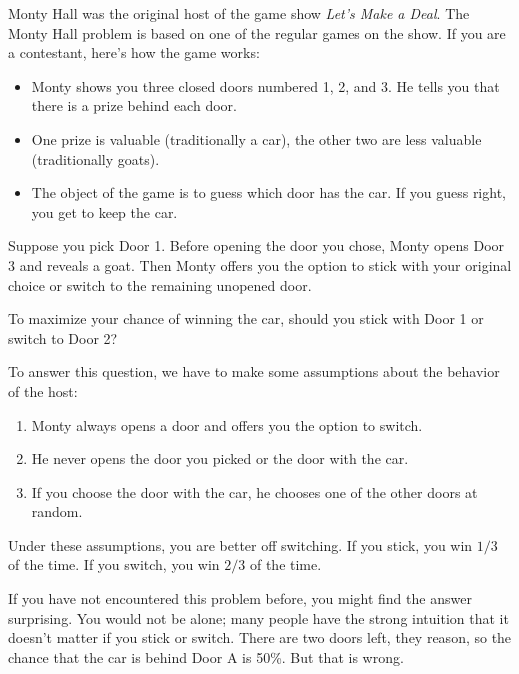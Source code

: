 \documentclass[12pt]{book}
\theoremstyle{exercise}
\begin{document}

Monty Hall was the original host of the game show {\em Let's Make a
Deal}.
The Monty Hall problem is based on one of the regular
games on the show.
If you are a contestant, here's how the game works:

\begin{itemize}

\item Monty shows you three closed doors numbered 1, 2, and 3.
He tells you that there is a prize behind each door.

\item One prize is valuable (traditionally a car), the other two are less valuable (traditionally goats).

\item The object of the game is to guess which door has the car.
If you guess right, you get to keep the car.

\end{itemize}

Suppose you pick Door 1.
Before opening the door you chose, Monty opens Door 3 and reveals a
goat.
Then Monty offers you the option to stick with your original
choice or switch to the remaining unopened door.

To maximize your chance of winning the car, should you stick with Door 1 or switch to Door 2?

To answer this question, we have to make some assumptions about the behavior of the host:

\begin{enumerate}

\item Monty always opens a door and offers you the option to switch.

\item He never opens the door you picked or the door with the car.

\item  If you choose the door with the car, he chooses one of the other doors at random.

\end{enumerate}

Under these assumptions, you are better off switching.
If you stick, you win $1/3$ of the time.
If you switch, you win $2/3$ of the time.

If you have not encountered this problem before, you might find the answer surprising.
You would not be alone; many people have the strong intuition that it doesn't matter if you stick or switch.
There are two doors left, they reason, so the chance that the car
is behind Door A is 50\%.
But that is wrong.
\end{document}
